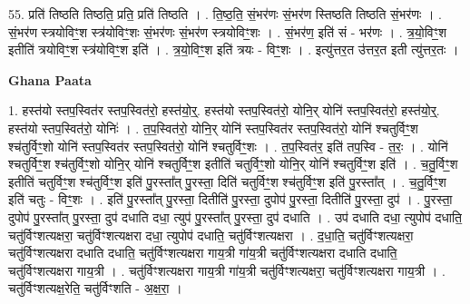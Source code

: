 \documentclass[17pt]{extarticle}
\begin{document}
55. प्रति॑ तिष्ठति तिष्ठति॒ प्रति॒ प्रति॑ तिष्ठति । . ति॒ष्ठ॒ति॒ सं॒भर॑णः सं॒भर॑ण स्तिष्ठति तिष्ठति सं॒भर॑णः । . सं॒भर॑ण स्त्रयोविꣳ॒॒श स्त्र॑योविꣳ॒॒शः सं॒भर॑णः सं॒भर॑ण स्त्रयोविꣳ॒॒शः । . सं॒भर॑ण॒ इति॑ सं - भर॑णः । . त्र॒यो॒विꣳ॒॒श इतीति॑ त्रयोविꣳ॒॒श स्त्र॑योविꣳ॒॒श इति॑ । . त्र॒यो॒विꣳ॒॒श इति॑ त्रयः - विꣳ॒॒शः । . इत्यु॑त्तर॒त उ॑त्तर॒त इती त्यु॑त्तर॒तः । \newline

\textbf{Ghana Paata } \newline

1. हस्त॑यो स्तप॒स्वित॑र स्तप॒स्वित॑रो॒ हस्त॑यो॒र्॒. हस्त॑यो स्तप॒स्वित॑रो॒ योनि॒र् योनि॑ स्तप॒स्वित॑रो॒ हस्त॑यो॒र्॒. हस्त॑यो स्तप॒स्वित॑रो॒ योनिः॑ । . त॒प॒स्वित॑रो॒ योनि॒र् योनि॑ स्तप॒स्वित॑र स्तप॒स्वित॑रो॒ योनि॑ श्चतुर्विꣳ॒॒श श्च॑तुर्विꣳ॒॒शो योनि॑ स्तप॒स्वित॑र स्तप॒स्वित॑रो॒ योनि॑ श्चतुर्विꣳ॒॒शः । . त॒प॒स्वित॑र॒ इति॑ तप॒स्वि - त॒रः॒ । . योनि॑ श्चतुर्विꣳ॒॒श श्च॑तुर्विꣳ॒॒शो योनि॒र् योनि॑ श्चतुर्विꣳ॒॒श इतीति॑ चतुर्विꣳ॒॒शो योनि॒र् योनि॑ श्चतुर्विꣳ॒॒श इति॑ । . च॒तु॒र्विꣳ॒॒श इतीति॑ चतुर्विꣳ॒॒श श्च॑तुर्विꣳ॒॒श इति॑ पु॒रस्ता᳚त् पु॒रस्ता॒ दिति॑ चतुर्विꣳ॒॒श श्च॑तुर्विꣳ॒॒श इति॑ पु॒रस्ता᳚त् । . च॒तु॒र्विꣳ॒॒श इति॑ चतुः - विꣳ॒॒शः । . इति॑ पु॒रस्ता᳚त् पु॒रस्ता॒ दितीति॑ पु॒रस्ता॒ दुपोप॑ पु॒रस्ता॒ दितीति॑ पु॒रस्ता॒ दुप॑ । . पु॒रस्ता॒ दुपोप॑ पु॒रस्ता᳚त् पु॒रस्ता॒ दुप॑ दधाति दधा॒ त्युप॑ पु॒रस्ता᳚त् पु॒रस्ता॒ दुप॑ दधाति । . उप॑ दधाति दधा॒ त्युपोप॑ दधाति॒ चतु॑र्विꣳशत्यक्षरा॒ चतु॑र्विꣳशत्यक्षरा दधा॒ त्युपोप॑ दधाति॒ चतु॑र्विꣳशत्यक्षरा । . द॒धा॒ति॒ चतु॑र्विꣳशत्यक्षरा॒ चतु॑र्विꣳशत्यक्षरा दधाति दधाति॒ चतु॑र्विꣳशत्यक्षरा गाय॒त्री गा॑य॒त्री चतु॑र्विꣳशत्यक्षरा दधाति दधाति॒ चतु॑र्विꣳशत्यक्षरा गाय॒त्री । . चतु॑र्विꣳशत्यक्षरा गाय॒त्री गा॑य॒त्री चतु॑र्विꣳशत्यक्षरा॒ चतु॑र्विꣳशत्यक्षरा गाय॒त्री । . चतु॑र्विꣳशत्यक्ष॒रेति॒ चतु॑र्विꣳशति - अ॒क्ष॒रा॒ । \newline
\end{document}
